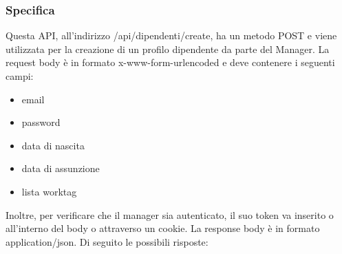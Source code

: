 \documentclass{report}
\begin{document}
\subsubsection*{Specifica}
Questa API, all'indirizzo /api/dipendenti/create, ha un metodo POST e viene utilizzata per la creazione di un profilo dipendente da parte del Manager.
La request body è in formato x-www-form-urlencoded e deve contenere i seguenti campi:
\begin{itemize}

	\item email
	\item password
	\item data di nascita
	\item data di assunzione
	\item lista worktag
\end{itemize}
Inoltre, per verificare che il manager sia autenticato, il suo token va inserito o all'interno del body o attraverso un cookie.
La response body è in formato application/json. Di seguito le possibili risposte:
\end{document}
